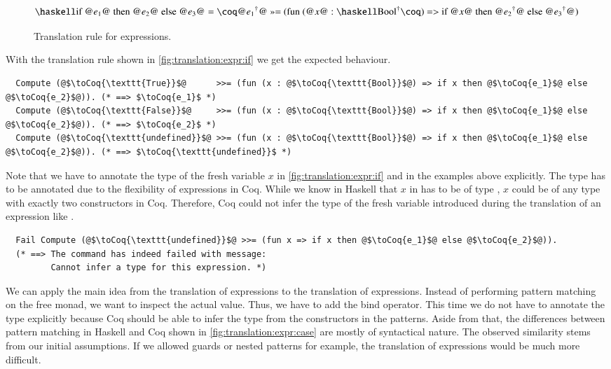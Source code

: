 \begin{figure}[H]
  \[
    \haskellM{if @$e_1$@ then @$e_2$@ else @$e_3$@}
      = \coqM{@$\toCoqX{e_1}$@ >>= (fun (@$x$@ :}\;\toCoq{\haskellM{Bool}}\coqM{) => if @$x$@ then @$\toCoqX{e_2}$@ else @$\toCoqX{e_3}$@)}
  \]
  \caption{Translation rule for  expressions.}
  \label{fig:translation:expr:if}
\end{figure}

With the translation rule shown in \autoref{fig:translation:expr:if} we get the expected behaviour.
\begin{verbatim}
  Compute (@$\toCoq{\texttt{True}}$@      >>= (fun (x : @$\toCoq{\texttt{Bool}}$@) => if x then @$\toCoq{e_1}$@ else @$\toCoq{e_2}$@)). (* ==> $\toCoq{e_1}$ *)
  Compute (@$\toCoq{\texttt{False}}$@     >>= (fun (x : @$\toCoq{\texttt{Bool}}$@) => if x then @$\toCoq{e_1}$@ else @$\toCoq{e_2}$@)). (* ==> $\toCoq{e_2}$ *)
  Compute (@$\toCoq{\texttt{undefined}}$@ >>= (fun (x : @$\toCoq{\texttt{Bool}}$@) => if x then @$\toCoq{e_1}$@ else @$\toCoq{e_2}$@)). (* ==> $\toCoq{\texttt{undefined}}$ *)
\end{verbatim}

Note that we have to annotate the type of the fresh variable $x$ in \autoref{fig:translation:expr:if} and in the examples above explicitly.
The type has to be annotated due to the flexibility of  expressions in Coq.
While we know in Haskell that $x$ in  has to be of type , $x$ could be of any type with exactly two constructors in Coq.
Therefore, Coq could not infer the type of the fresh variable introduced during the translation of an expression like .
\begin{verbatim}
  Fail Compute (@$\toCoq{\texttt{undefined}}$@ >>= (fun x => if x then @$\toCoq{e_1}$@ else @$\toCoq{e_2}$@)).
  (* ==> The command has indeed failed with message:
         Cannot infer a type for this expression. *)
\end{verbatim}

We can apply the main idea from the translation of  expressions to the translation of  expressions.
Instead of performing pattern matching on the free monad, we want to inspect the actual value.
Thus, we have to add the bind operator.
This time we do not have to annotate the type explicitly because Coq should be able to infer the type from the constructors in the patterns.
Aside from that, the differences between pattern matching in Haskell and Coq shown in \autoref{fig:translation:expr:case} are mostly of syntactical nature.
The observed similarity stems from our initial assumptions.
If we allowed guards or nested patterns for example, the translation of  expressions would be much more difficult.

